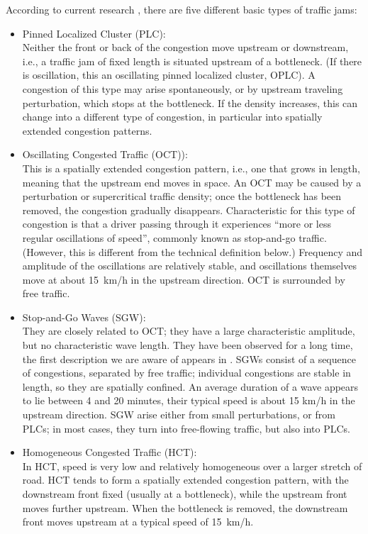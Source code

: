 \documentclass{acmrip}
\begin{document}
\iffalse
 According to current research \cite{sh-efctstitm-07}, there are
five different basic types of traffic jams:

    \begin{itemize}
    \item Pinned Localized Cluster (PLC):\\
Neither the front or back of the congestion move upstream or
downstream, i.e., a traffic jam of fixed length is situated upstream
of a bottleneck. (If there is oscillation, this an oscillating
pinned localized
    cluster, OPLC).
A congestion of this type may arise spontaneously, or by upstream
traveling perturbation, which stops at the bottleneck. If the
density increases, this can change into a different type of
congestion, in particular into spatially extended congestion
patterns.

    \item Oscillating Congested Traffic (OCT)):\\
    This is a spatially extended congestion pattern, i.e., one that
grows in length, meaning that the upstream end moves in space. An
OCT may be caused by a perturbation or supercritical traffic
density; once the bottleneck has been removed, the congestion
gradually disappears. Characteristic for this type of congestion is
that a driver passing through it experiences ``more or less regular
oscillations of speed'', commonly known as stop-and-go traffic.
(However, this is different from the technical definition below.)
Frequency and amplitude of the oscillations are relatively stable,
and oscillations themselves move at about 15~km/h in the upstream
direction. OCT is surrounded by free traffic.

    \item Stop-and-Go Waves (SGW):\\
They are closely related to OCT; they have a large characteristic
amplitude, but no characteristic wave length. They have been
observed for a long time, the first description we are aware of
appears in \cite{ef-tft-58}. SGWs consist of a sequence of
congestions, separated by free traffic; individual congestions are
stable in length, so they are spatially confined.
    An average duration of a wave appears to lie between 4 and 20 minutes,
their typical speed is about 15 km/h in the upstream direction. SGW
arise either from small perturbations, or from PLCs; in most cases,
they turn into free-flowing traffic, but also into PLCs.

    \item Homogeneous Congested Traffic (HCT):\\
In HCT, speed is very low and relatively homogeneous over a larger
stretch of road. HCT tends to form a spatially extended congestion
pattern, with the downstream front fixed (usually at a bottleneck),
while the upstream front moves further upstream. When the bottleneck
is removed, the downstream front moves upstream at a typical speed
of 15~km/h.


\end{itemize}
\end{document}
